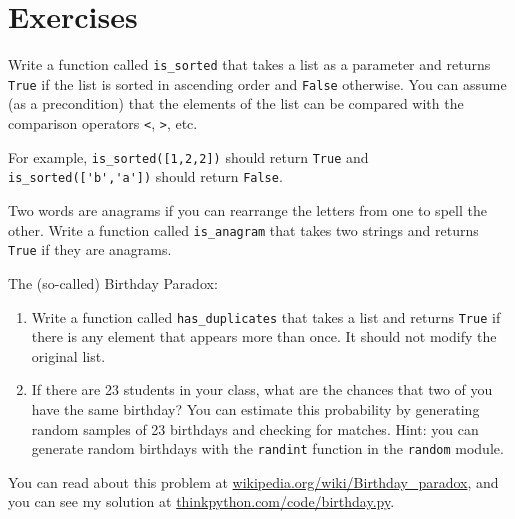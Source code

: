 \documentclass[10pt]{book}
\begin{document}
\section{Exercises}

\begin{ex}
Write a function called \verb"is_sorted" that takes a list as a
parameter and returns {\tt True} if the list is sorted in ascending
order and {\tt False} otherwise.  You can assume (as a precondition)
that the elements of the list can be compared with the comparison
operators {\tt <}, {\tt >}, etc.


For example, \verb"is_sorted([1,2,2])" should return {\tt True}
and \verb"is_sorted(['b','a'])" should return {\tt False}.
\end{ex}


\begin{ex}
\label{anagram}


Two words are anagrams if you can rearrange the letters from one
to spell the other.  Write a function called \verb"is_anagram"
that takes two strings and returns {\tt True} if they are anagrams.
\end{ex}


\begin{ex}
\label{duplicate}

The (so-called) Birthday Paradox:

\begin{enumerate}


\item Write a function called \verb"has_duplicates" that takes
a list and returns {\tt True} if there is any element that
appears more than once.  It should not modify the original
list.

\item If there are 23 students in your class, what are the chances
that two of you have the same birthday?  You can estimate this
probability by generating random samples of 23 birthdays
and checking for matches.  Hint: you can generate random birthdays
with the {\tt randint} function in the {\tt random} module.


\end{enumerate}

You can read about this problem at
\url{wikipedia.org/wiki/Birthday_paradox}, and you can see my solution
at \url{thinkpython.com/code/birthday.py}.

\end{ex}
\end{document}
